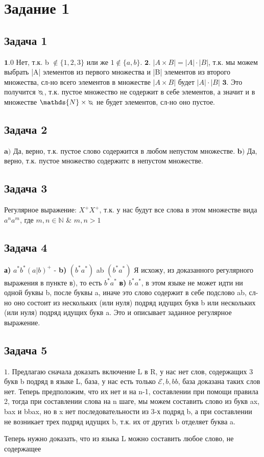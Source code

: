 \documentclass[a4paper,14pt]{article} %
\begin{document}

\section{Задание 1}
\subsection{Задача 1}

$\textbf{1.}0$ Нет, т.к. b $\notin \{1, 2, 3\}$ или же $1 \notin \{a, b\}$.
\newline
$\textbf{2.}$ $|A \times B| = |A| \cdot |B|$, т.к. мы можем выбрать |A| элементов из первого множества 
и |B| элементов из второго множества, сл-но всего элементов в множестве $|A \times B|$ будет $|A| \cdot |B|$
\newline
$\textbf{3.}$ Это получится $\invdiameter$, т.к. пустое множество не содержит в себе элементов, а значит 
и в множестве $\mathds{N} \times \invdiameter$ не будет элементов, сл-но оно пустое.

\subsection{Задача 2}
$\textbf{a)}$ Да, верно, т.к. пустое слово содержится в любом непустом множестве.
\newline
$\textbf{b)}$ Да, верно, т.к. пустое множество содержитс в непустом множестве.

\subsection{Задача 3}
Регулярное выражение: $X^{+}X^{+}$, т.к. у нас будут все слова в этом множестве вида $a^{n}a^{m}$, где $m, n \in \mathds{N}$ \& $m, n>1$

\subsection{Задача 4}
\textbf{а)} $a^{*}b^{*}(a|b)^{+}$ - 
\newline
\textbf{b)} $(b^{*}a^{*})$ ab $(b^{*}a^{*})$ Я исхожу, из доказанного регулярного выражения в пункте в), то есть $b^{*}a^{*}$ 
\newline
\textbf{в)} $b^{*}a^{*}$, в этом языке не может идти ни одной буквы b, после буквы a, иначе это слово содержит в себе подслово ab, сл-но оно состоит из нескольких (или нуля) подряд идущих букв b или нескольких (или нуля) подряд идущих букв a.
Это и описывает заданное регулярное выражение.
\subsection{Задача 5}
$1.$ Предлагаю сначала доказать включение L в R, у нас нет слов, содержащих 3 букв b подряд в языке L, база, у нас есть только $\mathcal{E}, b, bb$, база доказана таких слов нет.
Теперь предположим, что их нет и на n-1, составлении при помощи правила 2, тогда при составлении слова на n шаге, мы можем составить слово из букв ax, bax и bbax, но в x нет последовательности 
из 3-х подряд b, а при составлении не возникает трех подряд идущих b, т.к. их от других b отделяет буква a. 

Теперь нужно доказать, что из языка L можно составить любое слово, не содержащее
\end{document}
